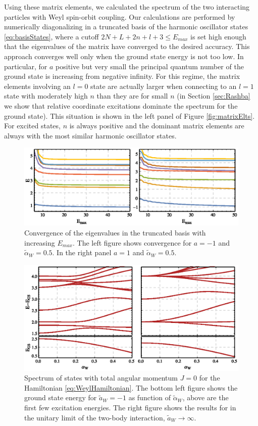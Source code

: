 \documentclass[%
 preprint,
 amsmath,amssymb,
 aps,
]{revtex4-1}
\begin{document}
Using these matrix elements, we calculated the spectrum of the two interacting particles with Weyl spin-orbit coupling. Our calculations are performed by numerically diagonalizing in a truncated basis of the harmonic oscillator states \eqref{eq:basisStates}, where a cutoff $2N+L+2n+l+3\leq E_{max}$ is set high enough that the eigenvalues of the matrix have converged to the desired accuracy.  This approach converges well only when the ground state energy is not too low. In particular, for $a$ positive but very small the principal quantum number of the ground state is increasing from negative infinity. For this regime, the matrix elements involving an $l=0$ state are actually larger when connecting to an $l=1$ state with moderately high $n$ than they are for small $n$ (in Section \ref{sec:Rashba} we show that relative coordinate excitations dominate the spectrum for the ground state). This situation is shown in the left panel of Figure \ref{fig:matrixElts}. For excited states, $n$ is always positive and the dominant matrix elements are always with the most similar harmonic oscillator states.

\begin{figure}
\includegraphics{Figures/WeylConvergence}
\caption{\label{fig:WeylConvergence} Convergence of the eigenvalues in the truncated basis with increasing $E_{max}$. The left figure shows convergence for $a=-1$ and $\tilde{\alpha}_W=0.5$. In the right panel  $a=1$ and $\tilde{\alpha}_W=0.5$.} 
\end{figure}


\begin{figure}
\includegraphics{Figures/WeylSpectrum}\caption{\label{fig:WeylSpectrum} Spectrum of states with total angular momentum $J=0$ for the Hamiltonian \eqref{eq:WeylHamiltonian}. The bottom left figure shows the ground state energy for $\tilde{a}_W=-1$ as function of $\tilde{\alpha}_W$, above are the first few excitation energies. The right figure shows the results for in the unitary limit of the two-body interaction, $\tilde{a}_W\rightarrow\infty$.} 
\end{figure}
\end{document}
